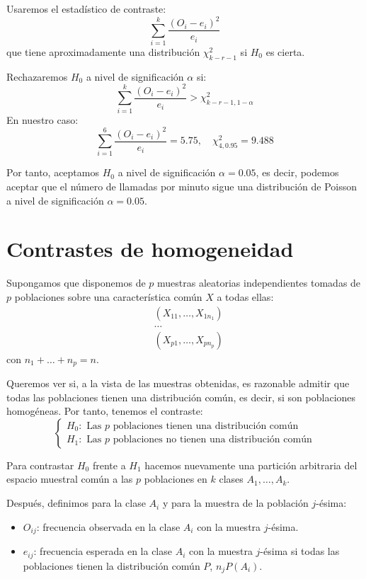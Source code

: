 \begin{example}
    Usaremos el estadístico de contraste:
    $$\sum_{i=1}^k \frac{(O_i-e_i)^2}{e_i}$$
    que tiene aproximadamente una distribución $\chi^2_{k-r-1}$ si $H_0$ es cierta.

    Rechazaremos $H_0$ a nivel de significación $\alpha$ si:
    $$\sum_{i=1}^k \frac{(O_i-e_i)^2}{e_i} > \chi^2_{k-r-1, 1-\alpha}$$
    En nuestro caso:
    $$\sum_{i=1}^6 \frac{(O_i-e_i)^2}{e_i} = 5.75, \quad \chi^2_{4, 0.95} = 9.488$$

    Por tanto, aceptamos $H_0$ a nivel de significación $\alpha = 0.05$, es decir, podemos aceptar que el número de llamadas por minuto sigue una distribución de Poisson a nivel de significación $\alpha = 0.05$.
\end{example}

\section{Contrastes de homogeneidad}
Supongamos que disponemos de $p$ muestras aleatorias independientes tomadas de $p$ poblaciones sobre una característica común $X$ a todas ellas:
\begin{align*}
     & (X_{11}, \dots, X_{1n_1}) \\
     & \dots                     \\
     & (X_{p1}, \dots, X_{pn_p})
\end{align*}
con $n_1 + \dots + n_p = n$.

Queremos ver si, a la vista de las muestras obtenidas, es razonable admitir que todas las poblaciones tienen una distribución común, es decir, si son poblaciones homogéneas.
Por tanto, tenemos el contraste:
$$\begin{cases}
        H_0: \text{ Las } p \text{ poblaciones tienen una distribución común} \\
        H_1: \text{ Las } p \text{ poblaciones no tienen una distribución común}
    \end{cases}$$

Para contrastar $H_0$ frente a $H_1$ hacemos nuevamente una partición arbitraria del espacio muestral común a las $p$ poblaciones en $k$ clases $A_1, \dots, A_k$.

Después, definimos para la clase $A_i$ y para la muestra de la población $j$-ésima:
\begin{itemize}
    \item $O_{ij}$: frecuencia observada en la clase $A_i$ con la muestra $j$-ésima.
    \item $e_{ij}$: frecuencia esperada en la clase $A_i$ con la muestra $j$-ésima si todas las poblaciones tienen la distribución común $P$, $n_jP(A_i)$.
\end{itemize}

